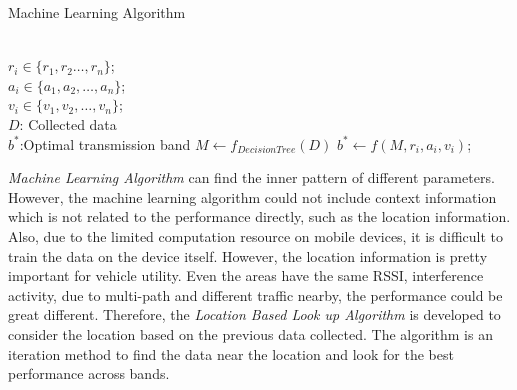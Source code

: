 	  \begin{algorithm}
	  \caption{Machine Learning Algorithm}
	  \label{algorithms: Machine}
	  \begin{algorithmic}[1]
	  \REQUIRE  ~~\\
		  $r_i \in \{r_1,r_2 \dots,r_n\}$;\\
		  $a_i \in \{a_1,a_2, \dots, a_n\}$;\\
		  $v_i \in \{v_1,v_2,\dots,v_n\}$;\\
		  $D$: Collected data
\ENSURE ~~\\    
		  $b^*$:Optimal transmission band
\STATE $M \leftarrow f_{Decision Tree}(D)$
\STATE $b^* \leftarrow f(M,r_i,a_i,v_i)$;
\end{algorithmic}
\end{algorithm}




\emph{Machine Learning Algorithm} can find the inner pattern of different parameters. However, the machine learning algorithm could not include context information which is not related to the performance directly, such as the location information. Also, due to the limited computation resource on mobile devices, it is difficult to train the data on the device itself. 
However, the location information is pretty important for vehicle utility.
Even the areas have the same RSSI, interference activity, due to multi-path and different traffic nearby, the performance could be great different.
Therefore, the \emph{Location Based Look up Algorithm} is developed to consider the location based on the previous data collected. The algorithm is an iteration method to find the data near the location and look for the best performance across bands.



